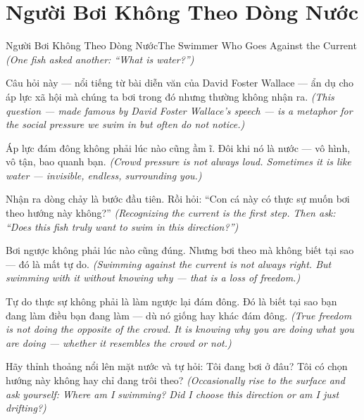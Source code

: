 \section{Người Bơi Không Theo Dòng Nước}
\begin{truyen}{Người Bơi Không Theo Dòng Nước}{The Swimmer Who Goes Against the Current}
\textit{(One fish asked another: ``What is water?'')}

Câu hỏi này — nổi tiếng từ bài diễn văn của David Foster Wallace — ẩn dụ cho áp lực xã hội mà chúng ta bơi trong đó nhưng thường không nhận ra.
\textit{(This question — made famous by David Foster Wallace's speech — is a metaphor for the social pressure we swim in but often do not notice.)}

Áp lực đám đông không phải lúc nào cũng ầm ĩ. Đôi khi nó là nước — vô hình, vô tận, bao quanh bạn.
\textit{(Crowd pressure is not always loud. Sometimes it is like water — invisible, endless, surrounding you.)}

Nhận ra dòng chảy là bước đầu tiên. Rồi hỏi: ``Con cá này có thực sự muốn bơi theo hướng này không?''
\textit{(Recognizing the current is the first step. Then ask: ``Does this fish truly want to swim in this direction?'')}

Bơi ngược không phải lúc nào cũng đúng. Nhưng bơi theo mà không biết tại sao — đó là mất tự do.
\textit{(Swimming against the current is not always right. But swimming with it without knowing why — that is a loss of freedom.)}

Tự do thực sự không phải là làm ngược lại đám đông. Đó là biết tại sao bạn đang làm điều bạn đang làm — dù nó giống hay khác đám đông.
\textit{(True freedom is not doing the opposite of the crowd. It is knowing why you are doing what you are doing — whether it resembles the crowd or not.)}

\end{truyen}

\begin{baihoc}
Hãy thỉnh thoảng nổi lên mặt nước và tự hỏi: Tôi đang bơi ở đâu? Tôi có chọn hướng này không hay chỉ đang trôi theo?
\textit{(Occasionally rise to the surface and ask yourself: Where am I swimming? Did I choose this direction or am I just drifting?)}
\end{baihoc}
